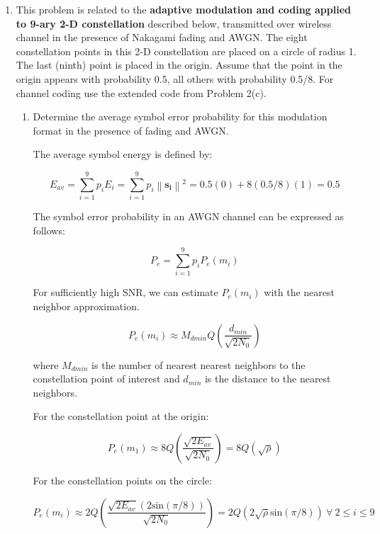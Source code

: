 \documentclass[fleqn]{article}
\newcommand{\norm}[1]{\left \lVert #1 \right \rVert}
\begin{document}
\begin{enumerate}
		\item This problem is related to the \textbf{adaptive modulation and coding applied to 9-ary 2-D constellation} described below, transmitted over wireless channel in the presence of Nakagami fading and AWGN. The eight constellation points in this 2-D constellation are placed on a circle of radius 1. The last (ninth) point is placed in the origin. Assume that the point in the origin appears with probability 0.5, all others with probability 0.5/8. For channel coding use the extended code from Problem 2(c).
		
		\begin{enumerate}
			\item Determine the average symbol error probability for this modulation format in the presence of fading and AWGN.
			
			The average symbol energy is defined by:
			
			\begin{equation*}
				E_{av} = \sum_{i=1}^{9}{p_iE_i} = \sum_{i=1}^{9}{p_i\norm{\mathbf{s_i}}^2} = 0.5(0) + 8(0.5/8)(1) = 0.5
			\end{equation*}
			
			The symbol error probability in an AWGN channel can be expressed as follows:
			
			\begin{equation*}
				P_e = \sum_{i=1}^{9}{p_iP_e(m_i)}
			\end{equation*}
				
			For sufficiently high SNR, we can estimate $P_e(m_i)$ with the nearest neighbor approximation.
			
			\begin{equation*}
				P_e(m_i) \approx M_{dmin}Q\left(\frac{d_{min}}{\sqrt{2N_0}}\right)
			\end{equation*}
			
			where $M_{dmin}$ is the number of nearest nearest neighbors to the constellation point of interest and $d_{min}$ is the distance to the nearest neighbors.
			
			For the constellation point at the origin:
			
			\begin{equation*}
				P_e(m_1) \approx 8Q\left(\frac{\sqrt{2E_{av}}}{{\sqrt{2N_0}}}\right) = 8Q(\sqrt{\rho})
			\end{equation*}
			
			For the constellation points on the circle:
			
			\begin{equation*}
				P_e(m_i) \approx 2Q\left(\frac{\sqrt{2E_{av}}(2\text{sin}(\pi/8))}{{\sqrt{2N_0}}}\right) = 2Q(2\sqrt{\rho}\text{sin}(\pi/8))\ \forall\ 2 \leq i \leq 9
			\end{equation*}
			

\end{enumerate}
\end{enumerate}
\end{document}
